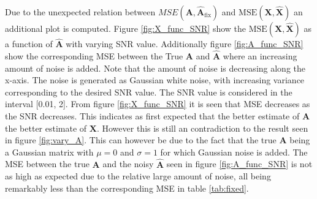 Due to the unexpected relation between $MSE(\mathbf{A}, \hat{\mathbf{A}}_{\text{fix}})$ and $\text{MSE}(\mathbf{X}, \hat{\mathbf{X}})$ an additional plot is computed. Figure \ref{fig:X_func_SNR} show the $\text{MSE}(\mathbf{X}, \hat{\mathbf{X}})$ as a function of $\hat{\textbf{A}}$ with varying SNR value. 
Additionally figure \ref{fig:A_func_SNR} show the corresponding MSE between the True $\textbf{A}$ and $\hat{\textbf{A}}$ where an increasing amount of noise is added.
Note that the amount of noise is decreasing along the x-axis. 
The noise is generated as Gaussian white noise, with increasing variance corresponding to the desired SNR value. The SNR value is considered in the interval [0.01, 2]. 
From figure \ref{fig:X_func_SNR} it is seen that MSE decreases as the SNR decreases. This indicates as first expected that the better estimate of $\textbf{A}$ the better estimate of $\textbf{X}$. However this is still an contradiction to the result seen in figure \ref{fig:vary_A}. 
This can however be due to the fact that the true $\textbf{A}$ being a Gaussian matrix with $\mu = 0$ and $\sigma = 1$ for which Gaussian noise is added. The MSE between the true $\textbf{A}$ and the noisy $\hat{\textbf{A}}$ seen in figure \ref{fig:A_func_SNR} is not as high as expected due to the relative large amount of noise, all being remarkably less than the corresponding MSE in table \ref{tab:fixed}.  


